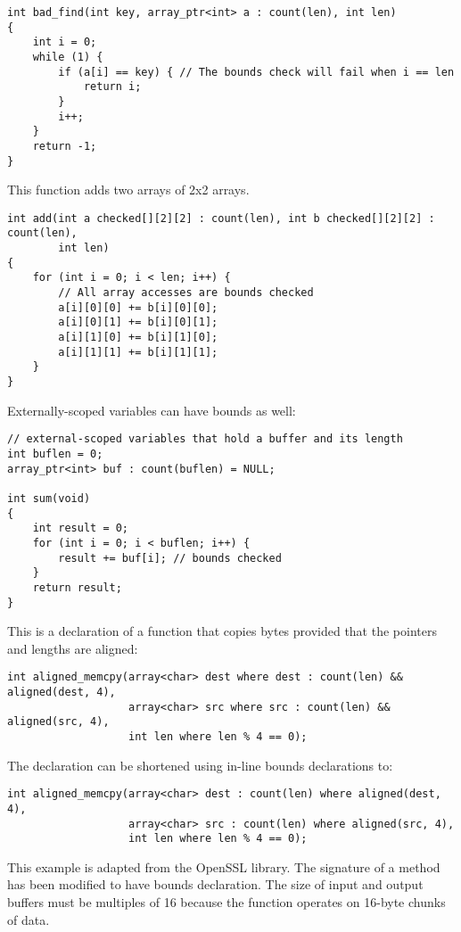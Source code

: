 \begin{verbatim}
int bad_find(int key, array_ptr<int> a : count(len), int len)
{
    int i = 0;
    while (1) {
        if (a[i] == key) { // The bounds check will fail when i == len
            return i;
        }
        i++;
    }
    return -1;
}

\end{verbatim}

This function adds two arrays of 2x2 arrays.

\begin{verbatim}
int add(int a checked[][2][2] : count(len), int b checked[][2][2] : count(len), 
        int len) 
{
    for (int i = 0; i < len; i++) {
        // All array accesses are bounds checked
        a[i][0][0] += b[i][0][0]; 
        a[i][0][1] += b[i][0][1];
        a[i][1][0] += b[i][1][0];
        a[i][1][1] += b[i][1][1];
    }
}
\end{verbatim}

Externally-scoped variables can have bounds as well:

\begin{verbatim}
// external-scoped variables that hold a buffer and its length
int buflen = 0;
array_ptr<int> buf : count(buflen) = NULL;

int sum(void)
{
    int result = 0;
    for (int i = 0; i < buflen; i++) {
        result += buf[i]; // bounds checked
    }
    return result;
}
\end{verbatim}

This is a declaration of a function that copies bytes provided that the
pointers and lengths are aligned:
\begin{verbatim}
int aligned_memcpy(array<char> dest where dest : count(len) && aligned(dest, 4),
                   array<char> src where src : count(len) && aligned(src, 4),
                   int len where len % 4 == 0);
\end{verbatim}

The declaration can be shortened using in-line bounds declarations to:

\begin{verbatim}
int aligned_memcpy(array<char> dest : count(len) where aligned(dest, 4),
                   array<char> src : count(len) where aligned(src, 4),
                   int len where len % 4 == 0);
\end{verbatim}

This example is adapted from the OpenSSL library. The signature of a
method has been modified to have bounds declaration. The size of input
and output buffers must be multiples of 16 because the function operates
on 16-byte chunks of data.

